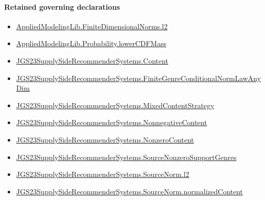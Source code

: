 \documentclass[10pt]{article}
\begin{document}
\paragraph{Retained governing declarations}
\begin{itemize}\raggedright
\item \hyperlink{governing-declaration-08313452edb53fe9}{Applied\allowbreak{}Modeling\allowbreak{}Lib.\allowbreak{}Finite\allowbreak{}Dimensional\allowbreak{}Norms.\allowbreak{}l2}
\item \hyperlink{governing-declaration-5dfc240c860659bf}{Applied\allowbreak{}Modeling\allowbreak{}Lib.\allowbreak{}Probability.\allowbreak{}lower\allowbreak{}CDF\allowbreak{}Mass}
\item \hyperlink{governing-declaration-367305fda50f0ada}{JGS23\allowbreak{}Supply\allowbreak{}Side\allowbreak{}Recommender\allowbreak{}Systems.\allowbreak{}Content}
\item \hyperlink{governing-declaration-127f397c2234da77}{JGS23\allowbreak{}Supply\allowbreak{}Side\allowbreak{}Recommender\allowbreak{}Systems.\allowbreak{}Finite\allowbreak{}Genre\allowbreak{}Conditional\allowbreak{}Norm\allowbreak{}Law\allowbreak{}Any\allowbreak{}Dim}
\item \hyperlink{governing-declaration-2089965d06cf0282}{JGS23\allowbreak{}Supply\allowbreak{}Side\allowbreak{}Recommender\allowbreak{}Systems.\allowbreak{}Mixed\allowbreak{}Content\allowbreak{}Strategy}
\item \hyperlink{governing-declaration-d426babe40b9593c}{JGS23\allowbreak{}Supply\allowbreak{}Side\allowbreak{}Recommender\allowbreak{}Systems.\allowbreak{}Nonnegative\allowbreak{}Content}
\item \hyperlink{governing-declaration-90e2ac7d13788c50}{JGS23\allowbreak{}Supply\allowbreak{}Side\allowbreak{}Recommender\allowbreak{}Systems.\allowbreak{}Nonzero\allowbreak{}Content}
\item \hyperlink{governing-declaration-78e20e84abcc253b}{JGS23\allowbreak{}Supply\allowbreak{}Side\allowbreak{}Recommender\allowbreak{}Systems.\allowbreak{}Source\allowbreak{}Nonzero\allowbreak{}Support\allowbreak{}Genres}
\item \hyperlink{governing-declaration-9299663ffe3ecb38}{JGS23\allowbreak{}Supply\allowbreak{}Side\allowbreak{}Recommender\allowbreak{}Systems.\allowbreak{}Source\allowbreak{}Norm.\allowbreak{}l2}
\item \hyperlink{governing-declaration-dd171705f4075880}{JGS23\allowbreak{}Supply\allowbreak{}Side\allowbreak{}Recommender\allowbreak{}Systems.\allowbreak{}Source\allowbreak{}Norm.\allowbreak{}normalized\allowbreak{}Content}

\end{itemize}
\end{document}
